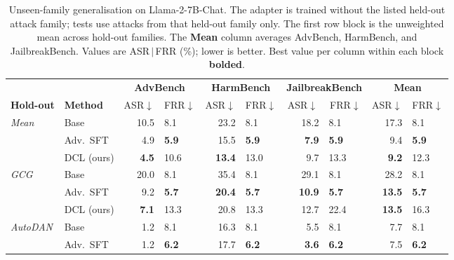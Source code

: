 \documentclass{article}
\begin{document}
\begin{table}[h]
\centering
\caption{Unseen-family generalisation on Llama-2-7B-Chat. The adapter is trained without the listed held-out attack family; tests use attacks from that held-out family only. The first row block is the unweighted mean across hold-out families. The \textbf{Mean} column averages AdvBench, HarmBench, and JailbreakBench. Values are ASR$\,|\,$FRR (\%); lower is better. Best value per column within each block \textbf{bolded}.}
\label{tab:unseen-results}
\small
\setlength{\tabcolsep}{4pt}
\begin{tabular}{ll *{4}{r@{\,|\,}l}}
\toprule
 & & \multicolumn{2}{c}{\textbf{AdvBench}} & \multicolumn{2}{c}{\textbf{HarmBench}} & \multicolumn{2}{c}{\textbf{JailbreakBench}} & \multicolumn{2}{c}{\textbf{Mean}} \\
\cmidrule(lr){3-4}\cmidrule(lr){5-6}\cmidrule(lr){7-8}\cmidrule(lr){9-10}
\textbf{Hold-out} & \textbf{Method} & \multicolumn{1}{c}{ASR$\downarrow$} & \multicolumn{1}{c}{FRR$\downarrow$} & \multicolumn{1}{c}{ASR$\downarrow$} & \multicolumn{1}{c}{FRR$\downarrow$} & \multicolumn{1}{c}{ASR$\downarrow$} & \multicolumn{1}{c}{FRR$\downarrow$} & \multicolumn{1}{c}{ASR$\downarrow$} & \multicolumn{1}{c}{FRR$\downarrow$} \\
\midrule
\multirow{3}{*}{\textit{Mean}}    & Base       & 10.5 & 8.1 & 23.2 & 8.1 & 18.2 & 8.1 & 17.3 & 8.1 \\
                                   & Adv.\ SFT  & 4.9  & \textbf{5.9} & 15.5 & \textbf{5.9} & \textbf{7.9} & \textbf{5.9} & 9.4  & \textbf{5.9} \\
                                   & DCL (ours) & \textbf{4.5} & 10.6 & \textbf{13.4} & 13.0 & 9.7 & 13.3 & \textbf{9.2} & 12.3 \\
\midrule
\multirow{3}{*}{\textit{GCG}}     & Base       & 20.0 & 8.1 & 35.4 & 8.1 & 29.1 & 8.1 & 28.2 & 8.1 \\
                                   & Adv.\ SFT  & 9.2  & \textbf{5.7} & \textbf{20.4} & \textbf{5.7} & \textbf{10.9} & \textbf{5.7} & \textbf{13.5} & \textbf{5.7} \\
                                   & DCL (ours) & \textbf{7.1} & 13.3 & 20.8 & 13.3 & 12.7 & 22.4 & \textbf{13.5} & 16.3 \\
\midrule
\multirow{3}{*}{\textit{AutoDAN}} & Base       & 1.2  & 8.1 & 16.3 & 8.1 & 5.5  & 8.1 & 7.7  & 8.1 \\
                                   & Adv.\ SFT  & 1.2  & \textbf{6.2} & 17.7 & \textbf{6.2} & \textbf{3.6} & \textbf{6.2} & 7.5  & \textbf{6.2} \\

\end{tabular}
\end{table}
\end{document}
